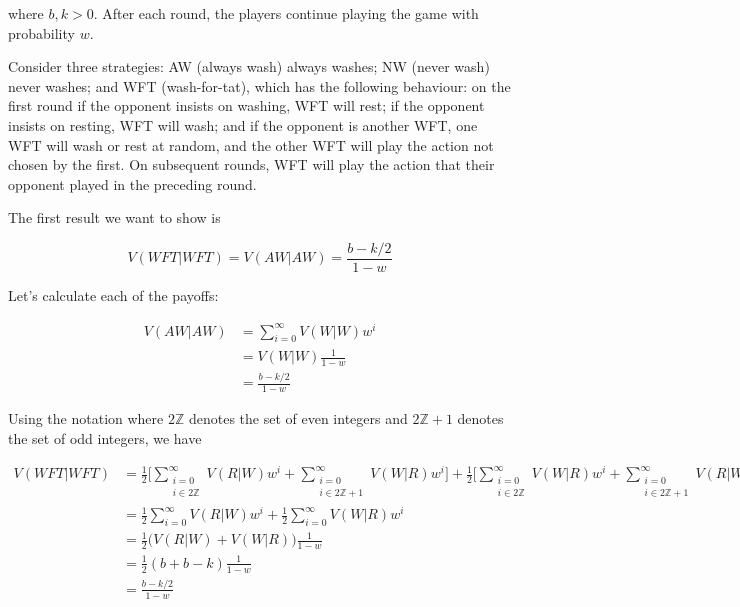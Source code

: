 \documentclass{article}
\begin{document}
where $b, k > 0$. After each round, the players continue playing the
game with probability $w$.

Consider three strategies: AW (always wash) always washes; NW (never
wash) never washes; and WFT (wash-for-tat), which has the following
behaviour: on the first round if the opponent insists on washing, WFT
will rest; if the opponent insists on resting, WFT will wash; and if the
opponent is another WFT, one WFT will wash or rest at random, and the
other WFT will play the action not chosen by the first. On subsequent
rounds, WFT will play the action that their opponent played in the
preceding round.

The first result we want to show is

\begin{equation*}
    V(WFT|WFT) = V(AW|AW) = \frac{b - k / 2}{1 - w}
\end{equation*}

Let's calculate each of the payoffs:

\begin{align*}
    V(AW|AW) &= \sum_{i = 0}^{\infty} V(W|W) w^i \\
             &= V(W|W) \frac{1}{1 - w} \\
             &= \frac{b - k / 2}{1 - w}
\end{align*}

Using the notation where $2 \mathbb{Z}$ denotes the set of even integers
and $2 \mathbb{Z} + 1$ denotes the set of odd integers, we have

\begin{align*}
    V(WFT|WFT) &=
        \frac{1}{2} \Bigg[
            \sum_{\substack{i = 0 \\ i \in 2 \mathbb{Z}}}^{\infty} V(R|W) w^i
            + \sum_{\substack{i = 0 \\ i \in 2 \mathbb{Z} + 1}}^{\infty} V(W|R) w^i
        \Bigg]
        + \frac{1}{2} \Bigg[
            \sum_{\substack{i = 0 \\ i \in 2 \mathbb{Z}}}^{\infty} V(W|R) w^i
            + \sum_{\substack{i = 0 \\ i \in 2 \mathbb{Z} + 1}}^{\infty} V(R|W) w^i
        \Bigg] \\
               &= \frac{1}{2} \sum_{i = 0}^{\infty} V(R|W) w^i + \frac{1}{2} \sum_{i = 0}^{\infty} V(W|R) w^i \\
               &= \frac{1}{2} \Big(V(R|W) + V(W|R)\Big) \frac{1}{1 - w} \\
               &= \frac{1}{2} (b + b - k) \frac{1}{1 - w} \\
               &= \frac{b - k / 2}{1 - w}
\end{align*}
\end{document}
